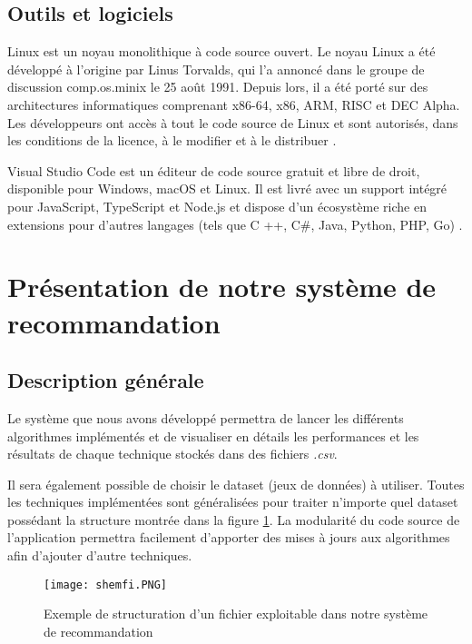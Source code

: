 \subsection{Outils et logiciels}
Linux est un noyau monolithique à code source ouvert. Le noyau Linux a été développé à l'origine par Linus Torvalds, qui l'a annoncé dans le groupe de discussion comp.os.minix le 25 août 1991. Depuis lors, il a été porté sur des architectures informatiques comprenant x86-64, x86, ARM, RISC et DEC Alpha. Les développeurs ont accès à tout le code source de Linux et sont autorisés, dans les conditions de la licence, à le modifier et à le distribuer \cite{ref40}.

Visual Studio Code est un éditeur de code source gratuit et libre de droit, disponible pour Windows, macOS et Linux. Il est livré avec un support intégré pour JavaScript, TypeScript et Node.js et dispose d'un écosystème riche en extensions pour d'autres langages (tels que C ++, C\#, Java, Python, PHP, Go) \cite{ref41}.

\section{Présentation de notre système de recommandation}
\subsection{Description générale}
Le système que nous avons développé permettra de lancer les différents
algorithmes implémentés et de visualiser en détails les performances et les résultats de chaque technique stockés dans des fichiers \textit{.csv}.

Il sera également possible de choisir le dataset (jeux de données) à utiliser. Toutes les techniques implémentées sont généralisées pour traiter n’importe quel dataset possédant la structure montrée dans la figure \ref{fig:shemfi}.
La modularité du code source de l’application permettra facilement d’apporter des mises à jours aux algorithmes afin d'ajouter d'autre techniques.
\begin{figure}[H]
	\centering
	\texttt{[image: shemfi.PNG]}
	\caption{Exemple de structuration d'un fichier exploitable dans notre système de recommandation}
	\label{fig:shemfi}
\end{figure}



